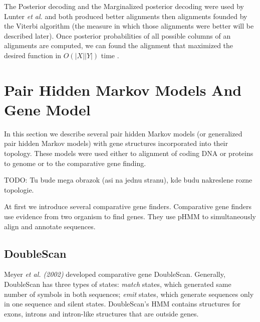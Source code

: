 The Posterior decoding and the Marginalized posterior decoding were used by
Lunter {\it et al.} and both produced better alignments then alignments founded
by the Viterbi algorithm (the measure in which those alignments were better will
be described later). Once posterior probabilities of all possible columns of an
alignments are computed, we can found the alignment that maximized the desired
function in $O(|X||Y|)$ time \cite{Lunter2008}. 



\section{Pair Hidden Markov Models And Gene Model}

In this section we describe several pair hidden Markov models (or generalized
pair hidden Markov models) with gene structures incorporated into their
topology. These models were used either to alignment of coding DNA or proteins
to genome or to the comparative gene finding.

TODO: Tu bude mega obrazok (asi na jednu stranu), kde budu nakreslene rozne
topologie.



At first we introduce several comparative gene finders. Comparative gene finders
use evidence from two organism to find genes. They use pHMM to simultaneously  
align and annotate sequences. 

\subsection{DoubleScan}
Meyer {\it et al. (2002)} developed comparative gene DoubleScan.
Generally, DoubleScan has three types of
states: {\it match} states, which generated same number of symbols in both
sequences;   {\it emit} states, which generate sequences only in one sequence
and silent states. DoubleScan's HMM contains structures for exons, introns and
intron-like structures that are outside genes. 


